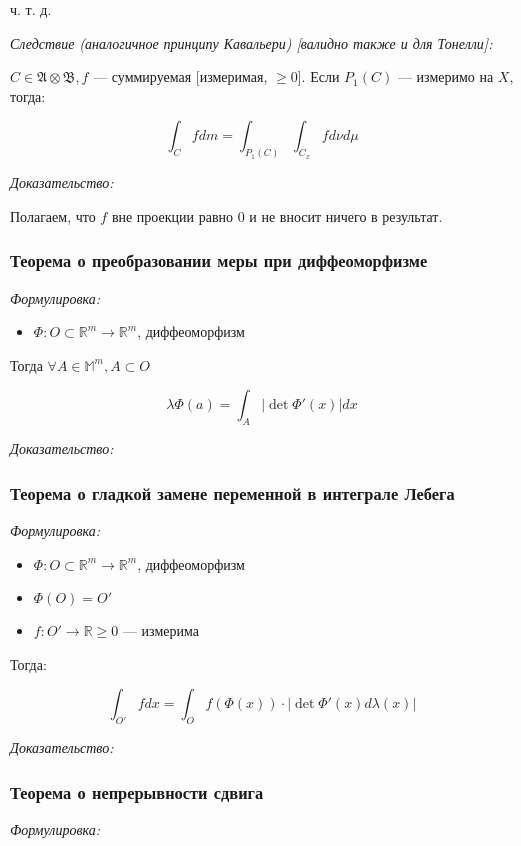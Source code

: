\documentclass{article}
\begin{document}
ч. т. д. 

\textit{Следствие (аналогичное принципу Кавальери) [валидно также и для Тонелли]:}

$C \in \mathfrak{A} \otimes \mathfrak{B}, f$ --- суммируемая [измеримая, $\ge 0$]. Если $P_1(C)$ --- измеримо на $X$, тогда:

\[\int_{C} f dm = \int_{P_1(C)} \int_{C_x} fd\nu d\mu\]

\textit{Доказательство:}

Полагаем, что $f$ вне проекции равно 0 и не вносит ничего в результат.


\subsubsection{Теорема о преобразовании меры при диффеоморфизме}
\textit{Формулировка:}

\begin{itemize}
    \item $\Phi: O \subset \mathbb{R}^{m} \rightarrow \mathbb{R}^{m}$, диффеоморфизм
\end{itemize}

Тогда $\forall A \in \mathbb{M}^{m}, A \subset O$

\[\lambda \Phi(a) = \int_{A} |\det \Phi'(x)| dx\]

\textit{Доказательство:}



\subsubsection{Теорема о гладкой замене переменной в интеграле Лебега}
\textit{Формулировка:}

\begin{itemize}
    \item $\Phi: O \subset \mathbb{R}^{m} \rightarrow \mathbb{R}^{m}$, диффеоморфизм
    \item $\Phi(O) = O'$
    \item $f: O' \rightarrow \mathbb{R} \ge 0$ --- измерима
\end{itemize}

Тогда:

\[\int_{O'} fdx = \int_{O} f\left(\Phi(x)\right) \cdot |\det \Phi'(x) d\lambda(x)|\]

\textit{Доказательство:}

\subsubsection{Теорема о непрерывности сдвига}
    \textit{Формулировка:}
\end{document}
